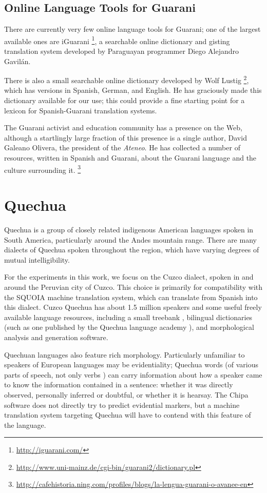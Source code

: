\subsection{Online Language Tools for Guarani}
There are currently very few online language tools for Guarani; one of the
largest available ones are iGuarani \footnote{\url{http://iguarani.com/}}, a
searchable online dictionary and gisting translation system developed by
Paraguayan programmer Diego Alejandro Gavilán.

There is also a small searchable online dictionary developed by Wolf Lustig
\footnote{\url{http://www.uni-mainz.de/cgi-bin/guarani2/dictionary.pl}},
which has versions in Spanish, German, and English. He has graciously made this
dictionary available for our use; this could provide a fine starting point for
a lexicon for Spanish-Guarani translation systems.

The Guarani activist and education community has a presence on the Web,
although a startlingly large fraction of this presence is a single author,
David Galeano Olivera, the president of the \emph{Ateneo}.
He has collected a number of resources, written in Spanish
and Guarani, about the Guarani language and the culture surrounding it.
\footnote{\url{http://cafehistoria.ning.com/profiles/blogs/la-lengua-guarani-o-avanee-en}}

\section{Quechua}
\label{sec:quechua}
Quechua is a group of closely related indigenous American languages spoken in
South America, particularly around the Andes mountain range.
There are many dialects of Quechua spoken throughout the region, which have
varying degrees of mutual intelligibility.

For the experiments in this work, we focus on the Cuzco dialect, spoken in and
around the Peruvian city of Cuzco. This choice is primarily for compatibility
with the SQUOIA machine translation system, which can translate from Spanish
into this dialect. Cuzco Quechua has about 1.5 million speakers and some useful
freely available language resources, including a small treebank
\cite{rios2009quechua}, bilingual dictionaries (such as one published by the
Quechua language academy \cite{academiamayor}), and morphological analysis and
generation software.

Quechuan languages also feature rich morphology. Particularly unfamiliar to
speakers of European languages may be evidentiality; Quechua words (of various
parts of speech, not only verbs \cite{coronel2002quechua}) can carry
information about how a speaker came to know the information contained in a
sentence: whether it was directly observed, personally inferred or doubtful, or
whether it is hearsay.
The Chipa software does not directly try to predict evidential markers, but a
machine translation system targeting Quechua will have to contend with this
feature of the language.
